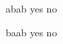 \documentclass{article}
\begin{document}
\vspace*{\fill}\vspace{-5ex}

\def\ttest#1#2{
    \def\a{#1}
    \def\b{#2}
    \ifx\a\b 
        yes 
    \else 
        no 
    \fi
}

\ttest{ab}{ab} \ttest{ba}{ab}

\vspace*{\fill}
\end{document}
